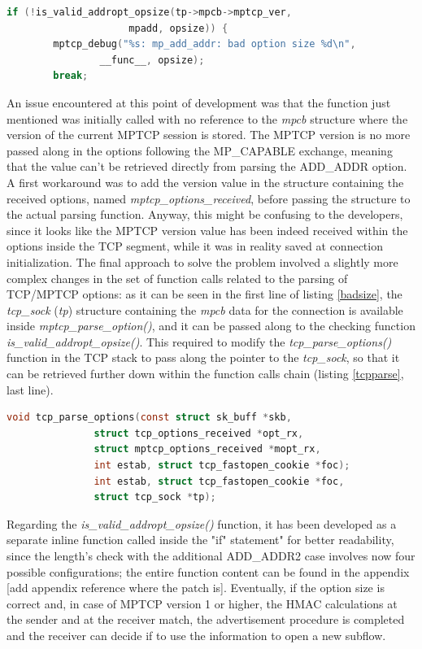 \begin{lstlisting}[language=c, caption=\textit{Check ADD\_ADDR size at the receiver, inside \textit{mptcp\_parse\_option()}}, label=badsize]
	if (!is_valid_addropt_opsize(tp->mpcb->mptcp_ver,
				     mpadd, opsize)) {
 		mptcp_debug("%s: mp_add_addr: bad option size %d\n",
 			    __func__, opsize);
 		break;
\end{lstlisting}

An issue encountered at this point of development was that the function just mentioned was initially called with no reference to the \textit{mpcb} structure where the version of the current MPTCP session is stored. The MPTCP version is no more passed along in the options following the MP\_CAPABLE exchange, meaning that the value can't be retrieved directly from parsing the ADD\_ADDR option. A first workaround was to add the version value in the structure containing the received options, named \textit{mptcp\_options\_received}, before passing the structure to the actual parsing function. Anyway, this might be confusing to the developers, since it looks like the MPTCP version value has been indeed received within the options inside the TCP segment, while it was in reality saved at connection initialization. The final approach to solve the problem involved a slightly more complex changes in the set of function calls related to the parsing of TCP/MPTCP options: as it can be seen in the first line of listing \ref{badsize}, the \textit{tcp\_sock} (\textit{tp}) structure containing the \textit{mpcb} data for the connection is available inside \textit{mptcp\_parse\_option()}, and it can be passed along to the checking function \textit{is\_valid\_addropt\_opsize()}. This required to modify the \textit{tcp\_parse\_options()} function in the TCP stack to pass along the pointer to the \textit{tcp\_sock}, so that it can be retrieved further down within the function calls chain (listing \ref{tcpparse}, last line).

\begin{lstlisting}[language=c, caption=\textit{New definition for \textit{tcp\_parse\_options}}, label=tcpparse]
void tcp_parse_options(const struct sk_buff *skb,
 		       struct tcp_options_received *opt_rx,
 		       struct mptcp_options_received *mopt_rx,
		       int estab, struct tcp_fastopen_cookie *foc);
		       int estab, struct tcp_fastopen_cookie *foc,
		       struct tcp_sock *tp);
\end{lstlisting}

Regarding the \textit{is\_valid\_addropt\_opsize()} function, it has been developed as a separate inline function called inside the "if" statement" for better readability, since the length's check with the additional ADD\_ADDR2 case involves now four possible configurations; the entire function content can be found in the appendix [add appendix reference where the patch is].
Eventually, if the option size is correct and, in case of MPTCP version 1 or higher, the HMAC calculations at the sender and at the receiver match, the advertisement procedure is completed and the receiver can decide if to use the information to open a new subflow.

